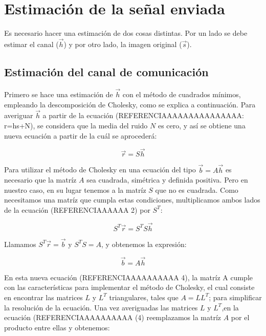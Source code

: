 \section{Estimaci\'on de la se\~nal enviada}

Es necesario hacer una estimaci\'on de dos cosas distintas. Por un lado se debe estimar el canal ($\vec{h}$) y por otro lado, la imagen original  ($\vec{s}$).

\subsection{Estimaci\'on del canal de comunicaci\'on}

Primero se hace una estimaci\'on de $\vec{h}$ con el m\'etodo de cuadrados m\'inimos, empleando la descomposici\'on de Cholesky, como se explica a continuaci\'on.  Para averiguar $\vec{h}$ a partir de la ecuaci\'on (REFERENCIAAAAAAAAAAAAAAA: r=hs+N), se considera que la media del ruido $N$ es cero, y as\'i se obtiene una nueva ecuaci\'on a partir de la cu\'al se aproceder\'a:

\begin{equation} 
\vec{r} = S \vec{h}  %
\end{equation} 

Para utilizar el m\'etodo de Cholesky en una ecuaci\'on del tipo $\vec{b} = A \vec{h}$ es necesario que la matr\'iz $A$ sea cuadrada, sim\'etrica y definida positiva. Pero en nuestro caso,  en su lugar tenemos a la matr\'iz $S$ que no es  cuadrada. Como necesitamos una matr\'iz que cumpla estas condiciones, multiplicamos ambos lados de la ecuaci\'on (REFERENCIAAAAAA 2) por $S^T$:

\begin{equation} 
S^T \vec{r} = S^T S \vec{h}  %
\end{equation} 

Llamamos  $S^T \vec{r} = \vec{b}$ y  $S^T S = A$, y obtenemos la expresi\'on:

\begin{equation} 
\vec{b} = A \vec{h}  %
\end{equation} 

En esta nueva ecuaci\'on (REFERENCIAAAAAAAAAA 4), la matr\'iz A cumple con las caracter\'isticas para implementar el m\'etodo de Cholesky, el cual consiste en encontrar las matrices $L$ y $L^T$ triangulares, tales que $A = L L^T$; para simplificar la resoluci\'on de la ecuaci\'on. Una vez averiguadas las matrices  $L$ y $L^T$,en la ecuaci\'on (REFERENCIAAAAAAAAAA (4) reemplazamos la matr\'iz $A$ por el producto entre ellas y obtenemos:

